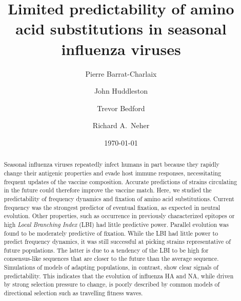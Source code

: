 \documentclass[reprint,amsmath,amssymb,superscriptaddress,showpacs,rmp]{revtex4-1}
\begin{document}
\title{Limited predictability of amino acid substitutions in seasonal influenza viruses}
\date{}

\author{Pierre Barrat-Charlaix}
%
\author{John Huddleston}
%
\author{Trevor Bedford}
%
\author{Richard A.~Neher}

\begin{abstract}
	Seasonal influenza viruses repeatedly infect humans in part because they rapidly change their antigenic properties and evade host immune responses, necessitating frequent updates of the vaccine composition.
	Accurate predictions of strains circulating in the future could therefore improve the vaccine match.
	Here, we studied the predictability of frequency dynamics and fixation of amino acid substitutions.
	Current frequency was the strongest predictor of eventual fixation, as expected in neutral evolution.
    Other properties, such as occurrence in previously characterized epitopes or high \emph{Local Branching Index} (LBI) had little predictive power.
	Parallel evolution was found to be moderately predictive of fixation.
	While the LBI had little power to predict frequency dynamics, it was still successful at picking strains representative of future populations.
	The latter is due to a tendency of the LBI to be high for consensus-like sequences that are closer to the future than the average sequence.
	Simulations of models of adapting populations, in contrast, show clear signals of predictability.
	This indicates that the evolution of influenza HA and NA, while driven by strong selection pressure to change, is poorly described by common models of directional selection such as travelling fitness waves.
\end{abstract}
\date{\today}
\maketitle
\end{document}
